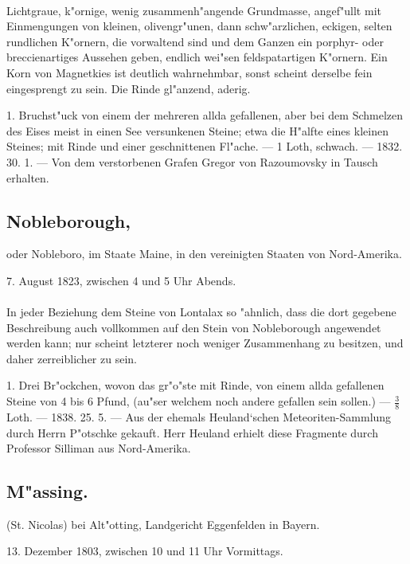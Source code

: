 \documentclass[a4paper, 11pt, oneside, polutonikogreek, german]{article}
\begin{document}
\paragraph{}
Lichtgraue, k"ornige, wenig zusammenh"angende Grundmasse, angef"ullt mit Einmengungen von kleinen, olivengr"unen, dann schw"arzlichen, eckigen, selten rundlichen K"ornern, die vorwaltend sind und dem Ganzen ein porphyr- oder breccienartiges Aussehen geben, endlich wei"sen feldspatartigen K"ornern. Ein Korn von Magnetkies ist deutlich wahrnehmbar, sonst scheint derselbe fein eingesprengt zu sein. Die Rinde gl"anzend, aderig.

1. Bruchst"uck von einem der mehreren allda gefallenen, aber bei dem Schmelzen des Eises meist in einen See versunkenen Steine; etwa die H"alfte eines kleinen Steines; mit Rinde und einer geschnittenen Fl"ache. --- 1 Loth, schwach. --- 1832. 30. 1. --- Von dem verstorbenen Grafen Gregor von Razoumovsky in Tausch erhalten.
\subsection[Nobleborough.]{Nobleborough,}
\begin{center}
\small
oder Nobleboro, im Staate Maine, in den vereinigten Staaten von Nord-Amerika.

7. August 1823, zwischen 4 und 5 Uhr Abends.
\end{center}
\paragraph{}
In jeder Beziehung dem Steine von Lontalax so "ahnlich, dass die dort gegebene Beschreibung auch vollkommen auf den Stein von Nobleborough angewendet werden kann; nur scheint letzterer noch weniger Zusammenhang zu besitzen, und daher zerreiblicher zu sein.

1. Drei Br"ockchen, wovon das gr"o"ste mit Rinde, von einem allda gefallenen Steine von 4 bis 6 Pfund, (au"ser welchem noch andere gefallen sein sollen.) --- $\frac{3}{8}$ Loth. --- 1838. 25. 5. --- Aus der ehemals Heuland‘schen Meteoriten-Sammlung durch Herrn P"otschke gekauft. Herr Heuland erhielt diese Fragmente durch Professor Silliman aus Nord-Amerika.
\subsection{M"assing.}
\begin{center}
\small
(St. Nicolas) bei Alt"otting, Landgericht Eggenfelden in Bayern.

13. Dezember 1803, zwischen 10 und 11 Uhr Vormittags.
\end{center}
\end{document}
